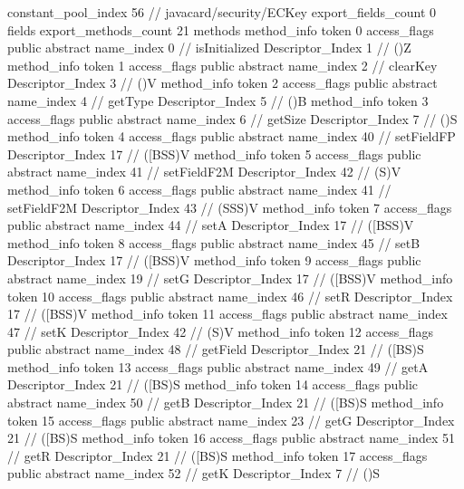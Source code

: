 {{{{				constant_pool_index	56		// javacard/security/ECKey
			}
			export_fields_count	0
			fields {
			}
			export_methods_count	21
			methods {
				method_info {
					token	0
					access_flags	public abstract
					name_index	0		// isInitialized
					Descriptor_Index	1		// ()Z
				}
				method_info {
					token	1
					access_flags	public abstract
					name_index	2		// clearKey
					Descriptor_Index	3		// ()V
				}
				method_info {
					token	2
					access_flags	public abstract
					name_index	4		// getType
					Descriptor_Index	5		// ()B
				}
				method_info {
					token	3
					access_flags	public abstract
					name_index	6		// getSize
					Descriptor_Index	7		// ()S
				}
				method_info {
					token	4
					access_flags	public abstract
					name_index	40		// setFieldFP
					Descriptor_Index	17		// ([BSS)V
				}
				method_info {
					token	5
					access_flags	public abstract
					name_index	41		// setFieldF2M
					Descriptor_Index	42		// (S)V
				}
				method_info {
					token	6
					access_flags	public abstract
					name_index	41		// setFieldF2M
					Descriptor_Index	43		// (SSS)V
				}
				method_info {
					token	7
					access_flags	public abstract
					name_index	44		// setA
					Descriptor_Index	17		// ([BSS)V
				}
				method_info {
					token	8
					access_flags	public abstract
					name_index	45		// setB
					Descriptor_Index	17		// ([BSS)V
				}
				method_info {
					token	9
					access_flags	public abstract
					name_index	19		// setG
					Descriptor_Index	17		// ([BSS)V
				}
				method_info {
					token	10
					access_flags	public abstract
					name_index	46		// setR
					Descriptor_Index	17		// ([BSS)V
				}
				method_info {
					token	11
					access_flags	public abstract
					name_index	47		// setK
					Descriptor_Index	42		// (S)V
				}
				method_info {
					token	12
					access_flags	public abstract
					name_index	48		// getField
					Descriptor_Index	21		// ([BS)S
				}
				method_info {
					token	13
					access_flags	public abstract
					name_index	49		// getA
					Descriptor_Index	21		// ([BS)S
				}
				method_info {
					token	14
					access_flags	public abstract
					name_index	50		// getB
					Descriptor_Index	21		// ([BS)S
				}
				method_info {
					token	15
					access_flags	public abstract
					name_index	23		// getG
					Descriptor_Index	21		// ([BS)S
				}
				method_info {
					token	16
					access_flags	public abstract
					name_index	51		// getR
					Descriptor_Index	21		// ([BS)S
				}
				method_info {
					token	17
					access_flags	public abstract
					name_index	52		// getK
					Descriptor_Index	7		// ()S
				}
}}}}

